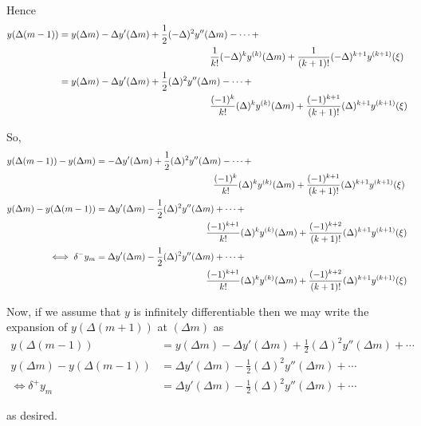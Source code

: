 \documentclass[12pt]{article}
\newlength\tindent
\renewcommand{\indent}{\hspace*{\tindent}}
\begin{document}
Hence
\begin{align*}
	y(\Delta(m - 1)) &= y(\Delta m) - \Delta y'(\Delta m) + \frac{1}{2}(-\Delta)^2y''(\Delta m) - \cdots + \\
	&\hphantom{{}={---------------}} \frac{1}{k!}(-\Delta)^ky^{(k)}(\Delta m)  + \frac{1}{(k + 1)!}(-\Delta)^{k + 1}y^{(k + 1)}(\xi) \\
	&= y(\Delta m) - \Delta y'(\Delta m) + \frac{1}{2}(\Delta)^2y''(\Delta m) - \cdots + \\
	&\hphantom{{}={---------------}} \frac{(-1)^{k}}{k!}(\Delta)^ky^{(k)}(\Delta m)  + \frac{(-1)^{k + 1}}{(k + 1)!}(\Delta)^{k + 1}y^{(k + 1)}(\xi)
\end{align*}

So,
\begin{align*}
	y(\Delta (m - 1)) - y(\Delta m) &= - \Delta y'(\Delta m) + \frac{1}{2}(\Delta)^2y''(\Delta m) - \cdots + \\
	&\hphantom{{}={------------}} \frac{(-1)^{k}}{k!}(\Delta)^ky^{(k)}(\Delta m)  + \frac{(-1)^{k + 1}}{(k + 1)!}(\Delta)^{k + 1}y^{(k + 1)}(\xi) \\
	y(\Delta m) - y(\Delta (m - 1)) &= \Delta y'(\Delta m) - \frac{1}{2}(\Delta)^2y''(\Delta m) + \cdots + \\
	&\hphantom{{}={-----------}} \frac{(-1)^{k + 1}}{k!}(\Delta)^ky^{(k)}(\Delta m)  + \frac{(-1)^{k + 2}}{(k + 1)!}(\Delta)^{k + 1}y^{(k + 1)}(\xi) \\
	\iff \delta^-y_m &= \Delta y'(\Delta m) - \frac{1}{2}(\Delta)^2y''(\Delta m) + \cdots + \\
	&\hphantom{{}={-----------}} \frac{(-1)^{k + 1}}{k!}(\Delta)^ky^{(k)}(\Delta m)  + \frac{(-1)^{k + 2}}{(k + 1)!}(\Delta)^{k + 1}y^{(k + 1)}(\xi) \\
\end{align*}

\indent Now, if we assume that $y$ is infinitely differentiable then we may write the expansion of $y(\Delta(m + 1))$ at $(\Delta m)$ as
\begin{align*}
	y(\Delta(m - 1)) &=  y(\Delta m) - \Delta y'(\Delta m) + \frac{1}{2}(\Delta)^2y''(\Delta m) + \cdots \\
	y(\Delta m) - y(\Delta (m - 1)) &=  \Delta y'(\Delta m) - \frac{1}{2}(\Delta)^2y''(\Delta m) + \cdots \\
	\iff \delta^+y_m &=  \Delta y'(\Delta m) - \frac{1}{2}(\Delta)^2y''(\Delta m) + \cdots 
\end{align*}

as desired. \\
\end{document}

